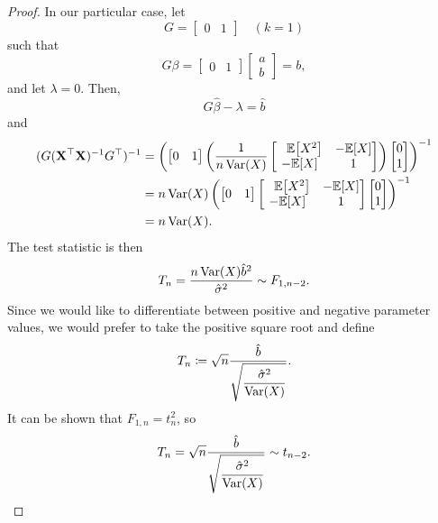\documentclass[letterpaper, reqno]{amsart}
\newtheorem{lemma}[theorem]{Lemma}
\numberwithin{equation}{section}
\newcommand{\T}{\top} %
\newcommand{\vect}[1]{\boldsymbol{\mathbf{#1}}} %
\newcommand{\ddfrac}[2]{\frac{\displaystyle #1}{\displaystyle #2}}
\newcommand{\E}[1]{\mathbb{E}\mleft[#1\mright]}
\newcommand{\Var}[1]{\operatorname{Var}\mleft(#1\mright)}
\newcommand{\R}{\mathbb{R}}  %
\newcommand{\N}[2]{\mathcal{N}\mleft( #1, #2 \mright)}
\newcommand{\Xm}{\vect{X}}
\newcommand{\Bv}{\beta}
\newcommand{\Bvh}{\hat{\beta}}
\DeclareMathOperator{\rank}{rank}
\begin{document}
\begin{proof}
  In our particular case, let
  \[ G = \begin{bmatrix} 0 & 1 \end{bmatrix} \quad (k = 1) \]
  such that
  \[ G\Bv = \begin{bmatrix} 0 & 1 \end{bmatrix} \begin{bmatrix} a \\ b \end{bmatrix} = b, \]
  and let $\lambda = 0$.
  Then, 
  \[ G\Bvh - \lambda = \hat{b} \]
  and
  \begin{align*}
    (G (\Xm^\T \Xm)^{-1} G^\T)^{-1} &=
    \left(
    \begin{bmatrix} 0 & 1 \end{bmatrix}
    \left(
    \frac{1}{n \Var{X}}
    \begin{bmatrix}
      \phantom{-}\E{X^2}  & -\E{X} \\
      -\E{X}              & 1
    \end{bmatrix}
    \right)
    \begin{bmatrix} 0 \\ 1 \end{bmatrix}
    \right)^{-1} \\
    &=
    n \Var{X}
    \left(
    \begin{bmatrix} 0 & 1 \end{bmatrix}
    \begin{bmatrix}
      \phantom{-}\E{X^2}  & -\E{X} \\
      -\E{X}              & 1
    \end{bmatrix}
    \begin{bmatrix} 0 \\ 1 \end{bmatrix}
    \right)^{-1} \\
    &= n \Var{X}.
  \end{align*}
  The test statistic is then
  \[ T_n = \frac{n \Var{X} \hat{b}^2}{\hat{\sigma}^2} \sim F_{1, n-2}. \]
  Since we would like to differentiate between positive and negative parameter
  values, we would prefer to take the positive square root and define
  \[ T_n \coloneqq \sqrt{n} \ddfrac{\hat{b}}{\sqrt{\frac{\hat{\sigma}^2}{\Var{X}}}}. \]
  It can be shown that $F_{1, n} = t_n^2$, so
  \[ T_n = \sqrt{n} \ddfrac{\hat{b}}{\sqrt{\frac{\hat{\sigma}^2}{\Var{X}}}} \sim t_{n-2}. \qedhere \]
\end{proof}

\end{document}
